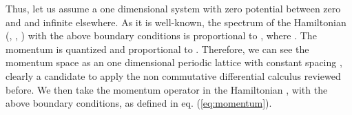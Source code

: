 \documentclass[a4paper,12pt]{article}
\begin{document}
Thus, let us assume a one dimensional system with 
zero potential between zero 
and \coordHE{} and infinite elsewhere. As it is well-known, the spectrum of the 
Hamiltonian (\coordHE{}, \coordHE{}, \coordHE{}) 
with the above boundary conditions is proportional 
to \coordHE{}, where 
\coordHE{}.  The momentum is quantized and 
proportional to \coordHE{}.  Therefore, we can 
see the momentum space as an one dimensional periodic lattice 
with constant spacing \coordHE{}, clearly 
a candidate to apply the non commutative differential 
calculus reviewed before. We then take the momentum operator
in the Hamiltonian \coordHE{}, with the above boundary conditions,
as defined in eq. (\ref{eq:momentum}). 
\end{document}
